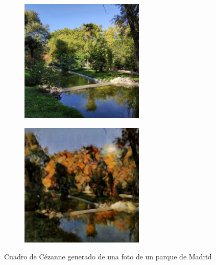 \documentclass[[../main.tex]{subfiles}
\begin{document}
        \begin{figure}[!htb]
            \begin{subfigure}[b]{0.49\textwidth}
            \includegraphics[width=0.65\textwidth]{imagenes/imagen2cuadro/propias/cezanne/IMG_20191026_123831_1.jpg}
            \end{subfigure}
        \hfill
            \begin{subfigure}[b]{0.49\textwidth}
            \includegraphics[width=0.65\textwidth]{imagenes/imagen2cuadro/propias/cezanne/IMG_20191026_123831_1_2.jpg}
            \end{subfigure}
        \caption{Cuadro de Cézanne generado de una foto de un parque de Madrid}
        \label{fig:cezanne_cuadro_parque_madrid}
        \end{figure}
        
\end{document}
